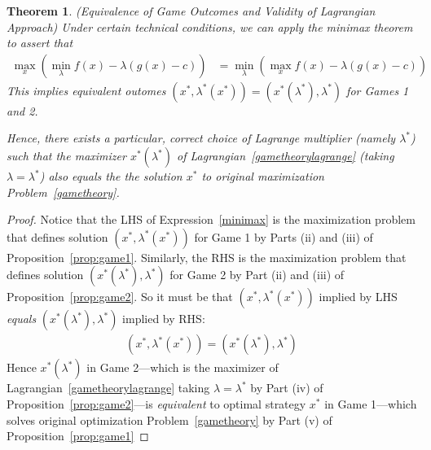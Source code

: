 \documentclass[12pt]{book}
\numberwithin{equation}{section} %
\theoremstyle{plain}
\newtheorem{thm}{Theorem}[section]
\theoremstyle{definition}
\theoremstyle{remark}
\newcommand{\ra}{\rightarrow}
\begin{document}
\begin{thm}
\emph{(Equivalence of Game Outcomes and Validity of Lagrangian Approach)}
Under certain technical conditions, we can apply the minimax theorem to
assert that
\begin{align}
  \max_x
  \left(
    \min_\lambda
    f(x) - \lambda(g(x)-c)
  \right)
  &=
  \min_\lambda
  \left(
    \max_x
    f(x) - \lambda(g(x)-c)
  \right)
  \label{minimax}
\end{align}
This implies equivalent outomes
$(x^*,\lambda^*(x^*))=(x^*(\lambda^*),\lambda^*)$ for Games 1 and 2.

Hence, there exists a particular, correct choice of Lagrange multiplier
(namely $\lambda^*$) such that the maximizer $x^*(\lambda^*)$ of
Lagrangian~\ref{gametheorylagrange} (taking $\lambda=\lambda^*$)
\emph{also} equals the the solution $x^*$ to original maximization
Problem~\ref{gametheory}.
\end{thm}
\begin{proof}
Notice that the LHS of Expression~\ref{minimax} is the maximization
problem that defines solution $(x^*,\lambda^*(x^*))$ for Game 1 by Parts
(ii) and (iii) of Proposition~\ref{prop:game1}.
Similarly, the RHS is the maximization problem that defines solution
$(x^*(\lambda^*),\lambda^*)$ for Game 2 by Part (ii) and (iii) of
Proposition~\ref{prop:game2}.
So it must be that $(x^*,\lambda^*(x^*))$ implied by LHS
\emph{equals} $(x^*(\lambda^*),\lambda^*)$ implied by RHS:
\begin{align*}
  (x^*,\lambda^*(x^*))
  = (x^*(\lambda^*),\lambda^*)
\end{align*}
Hence
$x^*(\lambda^*)$ in Game 2---which is the maximizer of
Lagrangian~\ref{gametheorylagrange} taking $\lambda=\lambda^*$ by Part
(iv) of Proposition~\ref{prop:game2}---is \emph{equivalent} to
optimal strategy $x^*$ in Game 1---which solves original optimization
Problem~\ref{gametheory} by Part (v) of Proposition~\ref{prop:game1}
\end{proof}




\end{document}
